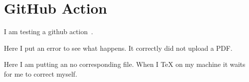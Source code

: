\section{GitHub Action}

I am testing a github action~\cite{latex-action}.

Here I put an error to see what happens.  It correctly did not upload a PDF.

Here I am putting an  no corresponding file.  When I TeX on my machine it waits for me to correct myself.

